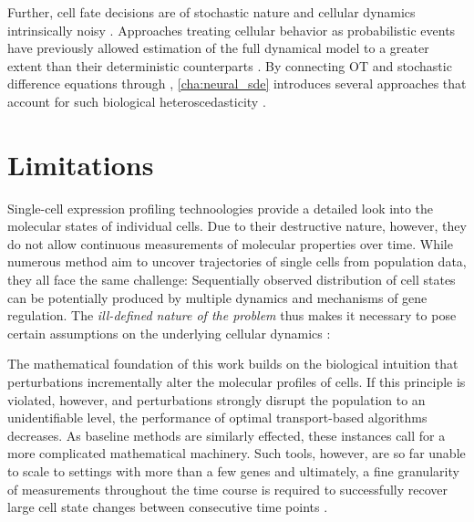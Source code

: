 Further, cell fate decisions are of stochastic nature and cellular dynamics intrinsically noisy \citep{wilkinson2009stochastic}.
Approaches treating cellular behavior as probabilistic events have previously allowed estimation of the full dynamical model to a greater extent than their deterministic counterparts \citep{bergen2020generalizing}.
By connecting OT and stochastic difference equations through , \cref{cha:neural_sde} introduces several approaches that account for such biological heteroscedasticity \citep{bunne2022recovering, somnath2023aligned}.

\section*{Limitations}

Single-cell expression profiling technoologies provide a detailed look into the molecular states of individual cells. Due to their destructive nature, however, they do not allow continuous measurements of molecular properties over time. While numerous method aim to uncover trajectories of single cells from population data, they all face the same challenge: Sequentially observed distribution of cell states can be potentially produced by multiple dynamics and mechanisms of gene regulation. The \emph{ill-defined nature of the problem} thus makes it necessary to pose certain assumptions on the underlying cellular dynamics \citep{weinreb2018fundamental}:

The mathematical foundation of this work builds on the biological intuition that perturbations incrementally alter the molecular profiles of cells. 
If this principle is violated, however, and perturbations strongly disrupt the population to an unidentifiable level, the performance of optimal transport-based algorithms decreases. As baseline methods are similarly effected, these instances call for a more complicated mathematical machinery.
Such tools, however, are so far unable to scale to settings with more than a few genes \citep{heydari2022iqcell} and ultimately, a fine granularity of measurements throughout the time course is required to successfully recover large cell state changes between consecutive time points \citep{tritschler2019concepts}. \\

